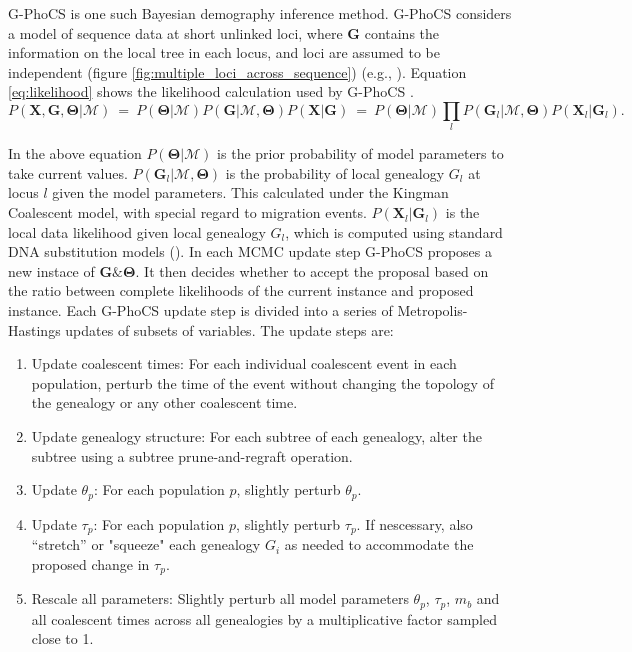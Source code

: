 \documentclass[11pt]{article}
\newcommand{\vect}[1]{\boldsymbol{\mathbf{#1}}}
\newcommand{\X}{\vect{X}}
\newcommand{\M}{\mathcal{M}}
\newcommand{\G}{\vect{G}}
\newcommand{\T}{\vect{\Theta}}
\newcommand{\1}{\mathbbm{1}}
\newcommand{\gp}{G-PhoCS }
\begin{document}
\gp is one such Bayesian demography inference method. \gp considers a model of sequence data at short unlinked loci, where $\G$ contains the information on the local tree in each locus, and loci are assumed to be independent (figure \ref{fig:multiple_loci_across_sequence}) (e.g., \cite{NIELWAKE01,RANNYANG03,GRONETAL11}).
Equation \ref{eq:likelihood} shows the likelihood calculation used by \gp.
%
\begin{equation}\label{eq:likelihood}
 P(\X,\G,\T|\M) ~=~ P(\T|\M) P(\G|\M,\T) P(\X|\G) ~=~ P(\T|\M) \prod_l P(\G_l|\M,\T) P(\X_l|\G_l).
\end{equation}

In the above equation $P(\T|\M)$ is the prior probability of model parameters to take current values. $P(\G_l|\M,\T)$ is the probability of local genealogy $G_l$ at locus $l$ given the model parameters. This calculated under the Kingman Coalescent model, with special regard to migration events. $P(\X_l|\G_l)$ is the local data likelihood given local genealogy $G_l$, which is computed using standard DNA substitution models (\cite{JUKECANT69}).
%
In each MCMC update step \gp proposes a new instace of $\G \& \T$. It then decides whether to accept the proposal based on the ratio between complete likelihoods of the current instance and proposed instance.
%
Each \gp update step is divided into a series of
Metropolis-Hastings updates of subsets of variables. The update steps are:

\begin{enumerate}
\item Update coalescent times: For each individual coalescent event in each population, perturb the time of the event without changing the topology of the genealogy or any other coalescent time. 

\item Update genealogy structure: For each subtree of each genealogy, alter the subtree using a subtree prune-and-regraft operation. 

\item Update $\theta_p$: For each population $p$, slightly perturb $\theta_p$.

\item Update $\tau_p$: For each population $p$, slightly perturb $\tau_p$. If nescessary, also “stretch” or "squeeze" each genealogy $G_i$ as needed to accommodate the proposed change in $\tau_p$. 
%

\item Rescale all parameters: Slightly perturb all model parameters ${\theta_p}$, ${\tau_p}$, ${m_b}$ and all coalescent
times across all genealogies by a multiplicative factor sampled close to 1.

\end{enumerate}
\end{document}
